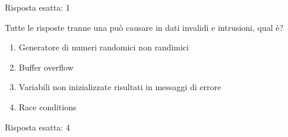 \begin{Answer} [
  ref={esControlli10},
  number={10}
  ]

  \Question Risposta esatta: 1
\end{Answer}


\begin{Exercise} [
  title={Quiz},
  label={esControlli11}
  ]

  \Question Tutte le risposte tranne una può causare in dati invalidi e 
intrusioni, qual è?
\begin{enumerate}
 \item Generatore di numeri randomici non randimici
 \item Buffer overflow
 \item Variabili non inizializzate risultati in messaggi di errore
 \item Race conditions
\end{enumerate}

\end{Exercise}

\begin{Answer} [
  ref={esControlli11},
  number={11}
  ]

  \Question Risposta esatta: 4
\end{Answer}
